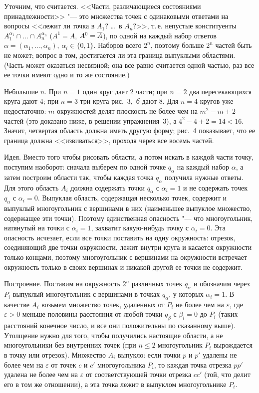 \begin{solution}[2 (\S\,2)]
Уточним, что считается. <<Части, различающиеся состояниями
принадлежности>> "--- это множества точек с одинаковыми ответами на вопросы
<<лежит ли точка в $A_1$? \dots\ в $A_n$?>>, т.\,е. непустые конституенты
$A_1^{\alpha_1}\cap\dots\cap A_n^{\alpha_n}$ ($A^1=A$, $A^0=\overline{A}$), по одной
на каждый набор ответов $\alpha=(\alpha_1,\dots,\alpha_n)$, $\alpha_i\in\{0,1\}$.
Наборов всего $2^n$, поэтому больше $2^n$ частей быть не может; вопрос в том,
достигается ли эта граница выпуклыми областями. (Часть может оказаться
несвязной; она все равно считается одной частью, раз все ее точки имеют
одно и то же состояние.)

Небольшие $n$. При $n=1$ один круг дает 2 части; при $n=2$ два
пересекающихся круга дают 4; при $n=3$ три круга рис.~3,~\emph{б} дают 8.
Для $n=4$ кругов уже недостаточно: $m$ окружностей делят плоскость не более
чем на $m^2-m+2$ частей (это доказано ниже, в решении упражнения~3),
а $4^2-4+2=14<16$. Значит, четвертая область должна иметь другую форму;
рис.~4 показывает, что ее граница должна <<извиваться>>, проходя через все
восемь частей.

Идея. Вместо того чтобы рисовать области, а потом искать в каждой части
точку, поступим наоборот: сначала выберем по одной точке $q_\alpha$ на
каждый набор $\alpha$, а затем построим области так, чтобы каждая точка
$q_\alpha$ получила нужные ответы. Для этого область $A_i$ должна содержать
точки $q_\alpha$ с $\alpha_i=1$ и не содержать точек $q_\alpha$ с
$\alpha_i=0$. Выпуклая область, содержащая несколько точек, содержит и
выпуклый многоугольник с вершинами в них (наименьшее выпуклое множество,
содержащее эти точки). Поэтому единственная опасность "--- что
многоугольник, натянутый на точки с $\alpha_i=1$, захватит какую-нибудь
точку с $\alpha_i=0$. Эта опасность исчезает, если все точки поставить на
одну окружность: отрезок, соединяющий две точки окружности, лежит внутри
круга и касается окружности только концами, поэтому многоугольник
с вершинами на окружности встречает окружность только в своих вершинах
и никакой другой ее точки не содержит.

Построение. Поставим на окружность $2^n$ различных точек $q_\alpha$ и
обозначим через $P_i$ выпуклый многоугольник с вершинами в точках
$q_\alpha$, у которых $\alpha_i=1$. В качестве $A_i$ возьмем множество
точек, удаленных от $P_i$ не более чем на $\varepsilon$, где $\varepsilon>0$
меньше половины расстояния от любой точки $q_\beta$ с $\beta_i=0$ до $P_i$
(таких расстояний конечное число, и все они положительны по сказанному
выше). Утолщение нужно для того, чтобы получились настоящие области, а не
многоугольники без внутренних точек (при $n\le2$ многоугольник $P_i$
вырождается в точку или отрезок). Множество $A_i$ выпукло: если точки $p$
и $p'$ удалены не более чем на $\varepsilon$ от точек $c$ и $c'$
многоугольника $P_i$, то каждая точка отрезка $pp'$ удалена не более чем на
$\varepsilon$ от соответствующей точки отрезка $cc'$ (той, что делит его
в том же отношении), а эта точка лежит в выпуклом многоугольнике $P_i$.


\end{solution}
